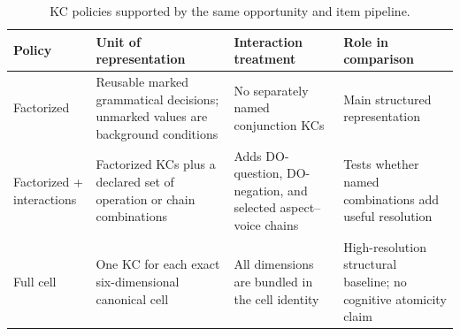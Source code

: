 \begin{table}[t]
  \centering
  \small
  \begin{tabularx}{\textwidth}{@{}lXXX@{}}
    \toprule
    Policy & Unit of representation & Interaction treatment & Role in comparison \\
    \midrule
    Factorized & Reusable marked grammatical decisions; unmarked values are
      background conditions & No separately named conjunction KCs & Main
      structured representation \\
    Factorized + interactions & Factorized KCs plus a declared set of
      operation or chain combinations & Adds DO-question, DO-negation, and
      selected aspect--voice chains & Tests whether named combinations add
      useful resolution \\
    Full cell & One KC for each exact six-dimensional canonical cell & All
      dimensions are bundled in the cell identity & High-resolution structural
      baseline; no cognitive atomicity claim \\
    \bottomrule
  \end{tabularx}
  \caption{KC policies supported by the same opportunity and item pipeline.}
  \label{tab:kc-policies}
\end{table}
